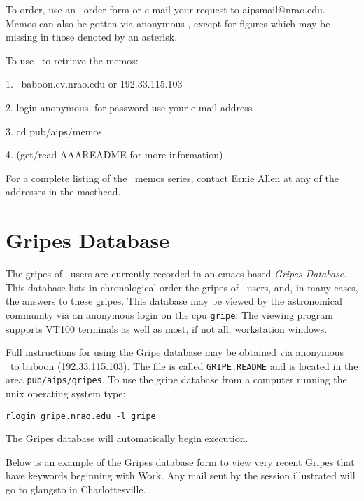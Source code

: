 To order, use an \AIPS\ order form or e-mail your request to
aipsmail@nrao.edu.  Memos can also be gotten via anonymous \ftp,
except for figures which may be missing in those denoted by an asterisk.

To use \ftp\ to retrieve the memos:
\begin{description}
\item{ 1.} \ftp\ baboon.cv.nrao.edu  or  192.33.115.103
\item{ 2.} login anonymous, for password use your e-mail address
\item{ 3.} cd pub/aips/memos
\item{ 4.} (get/read  AAAREADME for more information)
\end{description}

For a complete listing of the \AIPS\ memos series, contact Ernie Allen
at any of the addresses in the masthead.

\clearpage
\section{Gripes Database}

The gripes of \AIPS\ users are currently recorded in an emacs-based
{\it Gripes Database}.  This database lists in chronological order the
gripes of \AIPS\ users, and, in many cases, the answers to these gripes.
This database may be viewed by the astronomical community via an
anonymous login on the cpu {\tt gripe}.  The viewing program supports
VT100 terminals as well as most, if not all, workstation windows.

Full instructions for using the Gripe database may be obtained via
anonymous \ftp\ to baboon (192.33.115.103).  The file is called
{\tt GRIPE.README} and is located in the area {\tt pub/aips/gripes}.
To use the gripe database from a computer running the unix operating
system type:

\centerline{\tt rlogin gripe.nrao.edu -l gripe}

The Gripes database will automatically begin execution.

Below is an example of the Gripes database form to view very recent
Gripes that have keywords beginning with Work.  Any mail sent by the
session illustrated will go to glangsto in Charlottesville.

